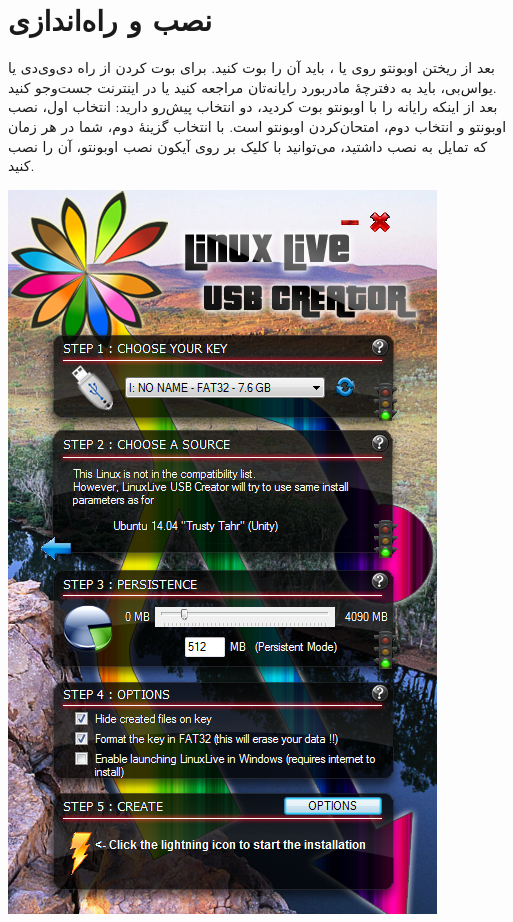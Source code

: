 \section{نصب و راه‌اندازی}
بعد از ریختن اوبونتو روی  یا ، باید آن را بوت کنید. برای بوت کردن از راه دی‌وی‌دی یا یواس‌بی، باید به دفترچهٔ مادربورد رایانه‌تان مراجعه کنید یا در اینترنت جست‌وجو کنید.\\
بعد از اینکه رایانه را با اوبونتو بوت کردید، دو انتخاب پیش‌رو دارید: انتخاب اول، نصب اوبونتو و انتخاب دوم، امتحان‌کردن اوبونتو است. با انتخاب گزینهٔ دوم، شما در هر زمان که تمایل به نصب داشتید، می‌توانید با کلیک بر روی آیکون نصب اوبونتو، آن را نصب کنید.\\
\begin{center}
\includegraphics[scale=0.45]{pics/1.png}\\
\end{center}
